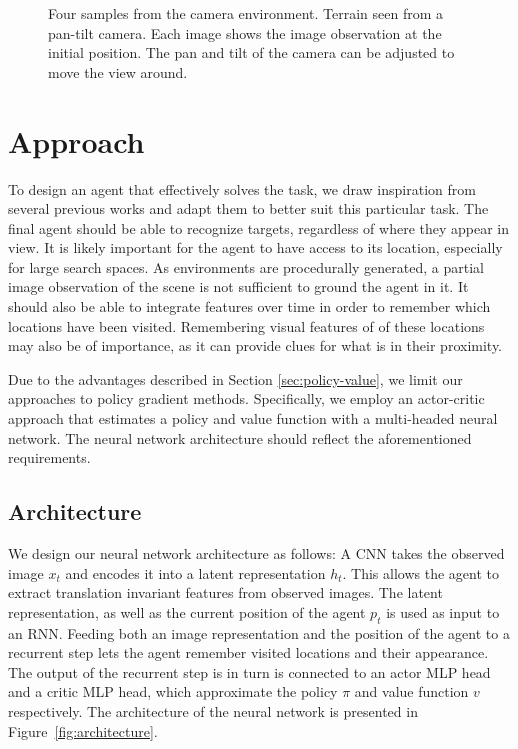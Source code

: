 \begin{figure}
    \centering
    
    \caption[Camera environment]{Four samples from the camera environment. Terrain seen from a pan-tilt camera. Each image shows the image observation at the initial position. The pan and tilt of the camera can be adjusted to move the view around.}
    \label{fig:camera}
\end{figure}

\section{Approach}
\label{sec:approach}

To design an agent that effectively solves the task, we draw inspiration from several previous works and adapt them to better suit this particular task.
The final agent should be able to recognize targets, regardless of where they appear in view.
It is likely important for the agent to have access to its location, especially for large search spaces.
As environments are procedurally generated, a partial image observation of the scene is not sufficient to ground the agent in it.
It should also be able to integrate features over time in order to remember which locations have been visited.
Remembering visual features of of these locations may also be of importance, as it can provide clues for what is in their proximity.

Due to the advantages described in Section \ref{sec:policy-value}, we limit our approaches to policy gradient methods.
Specifically, we employ an actor-critic approach that estimates a policy and value function with a multi-headed neural network.
The neural network architecture should reflect the aforementioned requirements.

\subsection{Architecture}

We design our neural network architecture as follows:
A CNN takes the observed image \(x_t\) and encodes it into a latent representation \(h_t\).
This allows the agent to extract translation invariant features from observed images.
The latent representation, as well as the current position of the agent \(p_t\) is used as input to an RNN.
Feeding both an image representation and the position of the agent to a recurrent step lets the agent remember visited locations and their appearance.
The output of the recurrent step is in turn is connected to an actor MLP head and a critic MLP head, which approximate the policy \(\pi\) and value function \(v\) respectively.
The architecture of the neural network is presented in Figure~\ref{fig:architecture}.

